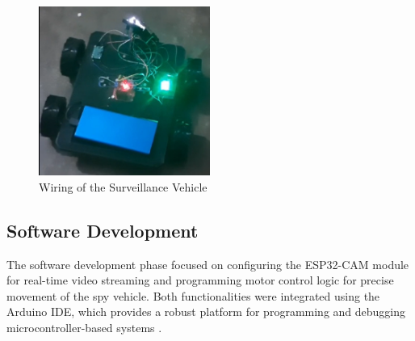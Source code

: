 \documentclass[12pt,a4paper]{report}
\begin{document}
\begin{enumerate}
\begin{itemize}
\begin{figure}[H]
    \centering
    \includegraphics[width=0.5\textwidth]{vehicle2}
    \caption{Wiring of the Surveillance Vehicle}
    \label{fig:vehicle2}
\end{figure}


\end{itemize}



\end{enumerate}


\label{Software Development}
\subsection{Software Development}

The software development phase focused on configuring the ESP32-CAM module for real-time video streaming and programming motor control logic for precise movement of the spy vehicle. Both functionalities were integrated using the Arduino IDE, which provides a robust platform for programming and debugging microcontroller-based systems \cite{esp32cam}.
\end{document}
